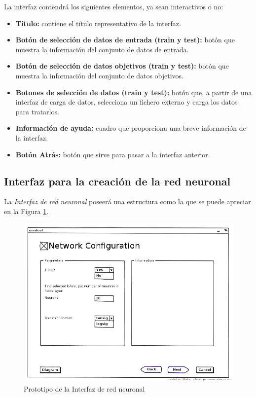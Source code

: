 			La interfaz contendrá los siguientes elementos, ya sean interactivos o no:
			
			\begin{itemize}
				\item \textbf{Título:} contiene el título representativo de la interfaz.
				\item \textbf{Botón de selección de datos de entrada (train y test):} botón que muestra la información del conjunto de datos de entrada.
				\item \textbf{Botón de selección de datos objetivos (train y test):} botón que muestra la información del conjunto de datos objetivos.
				\item \textbf{Botones de selección de datos (train y test):} botón que, a partir de una interfaz de carga de datos, selecciona un fichero externo y carga los datos para tratarlos.
				\item \textbf{Información de ayuda:} cuadro que proporciona una breve información de la interfaz.
				\item \textbf{Botón Atrás:} botón que sirve para pasar a la interfaz anterior.
			\end{itemize}
			
		\subsection{Interfaz para la creación de la red neuronal}
		
			La \textit{Interfaz de red neuronal} poseerá una estructura como la que se puede apreciar en la Figura \ref{fig:int2}.\\
			
			\begin{figure}[htbp]
				\centering
				\includegraphics[scale=0.5]{interfaz/Interfaz_net.png}
				\caption{Prototipo de la Interfaz de red neuronal}
				\label{fig:int2}
			\end{figure}
			
